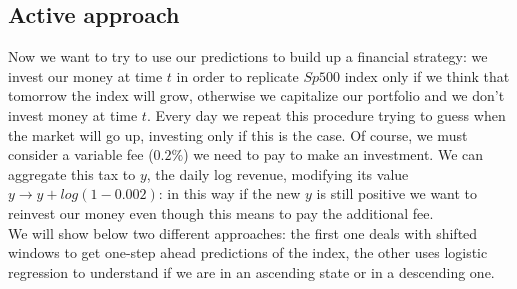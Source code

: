 \documentclass{article}%
\begin{document}
\subsection{Active approach}
Now we want to try to use our predictions to build up a financial strategy: we invest our money at time $t$  in order to replicate $Sp500$ index only if we think that tomorrow the index will grow, otherwise we capitalize our portfolio and we don't invest money at time $t$. Every day we repeat this procedure trying to guess when the market will go up, investing only if this is the case.  Of course, we must consider a variable fee ($0.2\%$) we need to pay to make an investment.  We can aggregate this tax
to $y$, the daily log revenue, modifying its value $y\rightarrow y+log(1-0.002)$: in this way if the new $y$ is still positive we want to reinvest our money even though this means to pay the additional fee.
\\

We will show below two different approaches: the first one deals with shifted windows to get one-step ahead predictions of the index, the other uses logistic regression to understand if we are in an ascending state or in a descending one.
\end{document}
